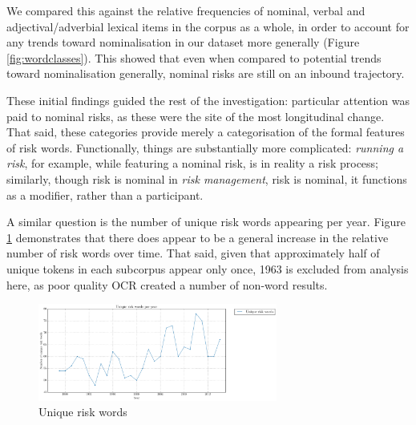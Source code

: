 
	We compared this against the relative frequencies of nominal, verbal and adjectival/adverbial lexical items in the corpus as a whole, in order to account for any trends toward nominalisation in our dataset more generally (Figure \ref{fig:wordclasses}). This showed that even when compared to potential trends toward nominalisation generally, nominal risks are still on an inbound trajectory.


	These initial findings guided the rest of the investigation: particular attention was paid to nominal risks, as these were the site of the most longitudinal change. That said, these categories provide merely a categorisation of the formal features of risk words. Functionally, things are substantially more complicated: \emph{running a risk}, for example, while featuring a nominal risk, is in reality a risk process; similarly, though risk is nominal in \emph{risk management}, risk is nominal, it functions as a modifier, rather than a participant.

    A similar question is the number of unique risk words appearing per year. Figure \ref{fig:diffriskwords} demonstrates that there does appear to be a general increase in the relative number of risk words over time. That said, given that approximately half of unique tokens in each subcorpus appear only once, 
        1963 is excluded from analysis here, as poor quality OCR created a number of non-word results.

            \begin{figure}[htb!]
            \centering
            \includegraphics[width=0.7\textwidth]{../images/unique_risk_words_per_year.png}
            \caption{Unique risk words}
            \label{fig:diffriskwords}
            \end{figure}



